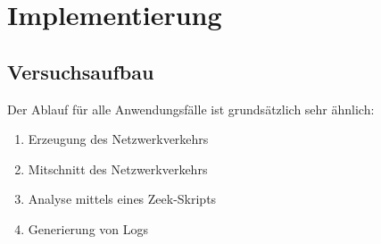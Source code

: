 
\chapter{Implementierung}%
\label{cha:implementation}





\section{Versuchsaufbau}
Der Ablauf für alle Anwendungsfälle ist grundsätzlich sehr ähnlich:
\begin{enumerate}
\item{Erzeugung des Netzwerkverkehrs}
\item{Mitschnitt des Netzwerkverkehrs}
\item{Analyse mittels eines Zeek-Skripts}
\item{Generierung von Logs}
\end{enumerate}
